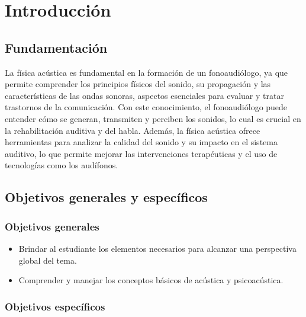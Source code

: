 \chapter{Introducción}
\section{Fundamentación}

La física acústica es fundamental en la formación de un fonoaudiólogo, ya que permite comprender los principios físicos del sonido, su propagación y las características de las ondas sonoras, aspectos esenciales para evaluar y tratar trastornos de la comunicación. Con este conocimiento, el fonoaudiólogo puede entender cómo se generan, transmiten y perciben los sonidos, lo cual es crucial en la rehabilitación auditiva y del habla. Además, la física acústica ofrece herramientas para analizar la calidad del sonido y su impacto en el sistema auditivo, lo que permite mejorar las intervenciones terapéuticas y el uso de tecnologías como los audífonos.

\section{Objetivos generales y específicos}

\subsection{Objetivos generales}

\begin{itemize}
     \setlength\itemsep{0.3em}        
	\item Brindar al estudiante los elementos necesarios para alcanzar una perspectiva global del tema.
	\item Comprender y manejar los conceptos básicos de acústica y psicoacústica.

\end{itemize}   

\subsection{Objetivos específicos}  

